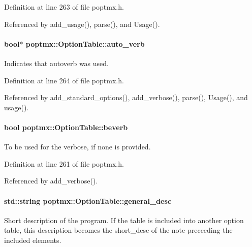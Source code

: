 Definition at line 263 of file poptmx.h.



Referenced by add\_\-usage(), parse(), and Usage().

\hypertarget{classpoptmx_1_1OptionTable_acfd37d94b34e7b3262dbcb47ec2d9a51}{
\paragraph[{auto\_\-verb}]{\setlength{\rightskip}{0pt plus 5cm}bool$\ast$ {\bf poptmx::OptionTable::auto\_\-verb}}\hfill}
\label{classpoptmx_1_1OptionTable_acfd37d94b34e7b3262dbcb47ec2d9a51}


Indicates that autoverb was used. 



Definition at line 264 of file poptmx.h.



Referenced by add\_\-standard\_\-options(), add\_\-verbose(), parse(), Usage(), and usage().

\hypertarget{classpoptmx_1_1OptionTable_a7e3eec8a2c01e6cbe0d7584bfd6d563b}{
\paragraph[{beverb}]{\setlength{\rightskip}{0pt plus 5cm}bool {\bf poptmx::OptionTable::beverb}}\hfill}
\label{classpoptmx_1_1OptionTable_a7e3eec8a2c01e6cbe0d7584bfd6d563b}


To be used for the verbose, if none is provided. 



Definition at line 261 of file poptmx.h.



Referenced by add\_\-verbose().

\hypertarget{classpoptmx_1_1OptionTable_a0bfb132b39096093f9809dbd0b06ac31}{
\paragraph[{general\_\-desc}]{\setlength{\rightskip}{0pt plus 5cm}std::string {\bf poptmx::OptionTable::general\_\-desc}}\hfill}
\label{classpoptmx_1_1OptionTable_a0bfb132b39096093f9809dbd0b06ac31}
Short description of the program. If the table is included into another option table, this description becomes the short\_\-desc of the note preceeding the included elements. 

